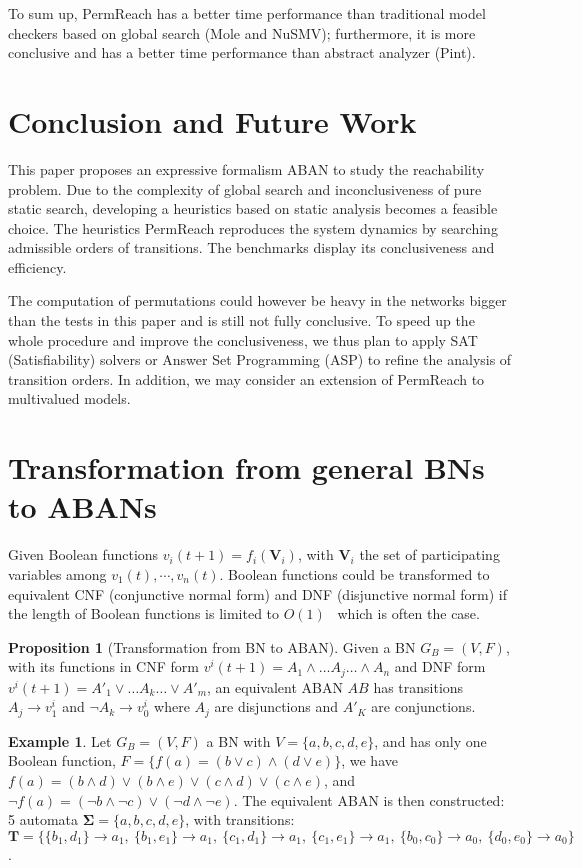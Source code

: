 \documentclass{article}
\newcommand{\acm}[3]{\{#1\}\rightarrow#3}
\theoremstyle{definition}
\newtheorem{example}{Example}
\newtheorem{proposition}{Proposition}
\begin{document}
To sum up, PermReach has a better time performance than traditional model checkers based on global search (Mole and NuSMV); furthermore, it is more conclusive and has a better time performance than abstract analyzer (Pint).

\section{Conclusion and Future Work}\label{sect:6}
This paper proposes an expressive formalism ABAN to study the reachability problem. 
Due to the complexity of global search and inconclusiveness of pure static search, developing a heuristics based on static analysis becomes a feasible choice.
The heuristics PermReach reproduces the system dynamics by searching admissible orders of transitions.
The benchmarks display its conclusiveness and efficiency.

The computation of permutations could however be heavy in the networks bigger than the tests in this paper and is still not fully conclusive. 
To speed up the whole procedure and improve the conclusiveness, we thus plan to apply SAT (Satisfiability) solvers or Answer Set Programming (ASP) to refine the analysis of transition orders. 
In addition, we may consider an extension of PermReach to multivalued models.



\appendix
\section{Transformation from general BNs to ABANs}\label{appendix:trans}

Given Boolean functions $v_i(t+1)=f_i(\mathbf{V}_i)$, with $\mathbf{V}_i$ the set of participating variables among $v_1(t),\cdots,v_n(t)$.
Boolean functions could be transformed to equivalent CNF (conjunctive normal form) and DNF (disjunctive normal form) if the length of Boolean functions is limited to $O(1)$~\cite{miltersen2005converting} which is often the case.
\begin{proposition}[Transformation from BN to ABAN]
Given a BN $G_B=(V,F)$, with its functions in CNF form $v^i(t+1)=A_1\land\ldots A_j \ldots\land A_n$ and DNF form $v^i(t+1)=A'_1\lor\ldots A_k\ldots\lor A'_m$, an equivalent ABAN $AB$ has transitions $A_j\to v^i_1$ and $\lnot A_k\to v^i_0$ where $A_j$ are disjunctions and $A'_K$ are conjunctions.
\end{proposition}
\begin{example}
Let $G_B=(V,F)$ a BN with $V=\{a,b,c,d,e\}$, and has only one Boolean function, $F=\{f(a)= (b\lor c)\land(d\lor e)\}$, we have 
$f(a)=(b\land d)\lor(b\land e)\lor(c\land d)\lor(c\land e)$, and $\lnot f(a)=(\lnot b\land \lnot c)\lor(\lnot d\land \lnot e)$. 
The equivalent ABAN is then constructed: 5 automata $\mathbf{\Sigma}=\{a,b,c,d,e\}$, with transitions: $\mathbf{T}=\{\acm{b_1,d_1}{a_0}{a_1},\ \acm{b_1,e_1}{a_0}{a_1},\ \acm{c_1,d_1}{a_0}{a_1},\ \acm{c_1,e_1}{a_0}{a_1},\ \acm{b_0,c_0}{a_1}{a_0},\ \acm{d_0,e_0}{a_1}{a_0}\}$.
\end{example}
\end{document}
